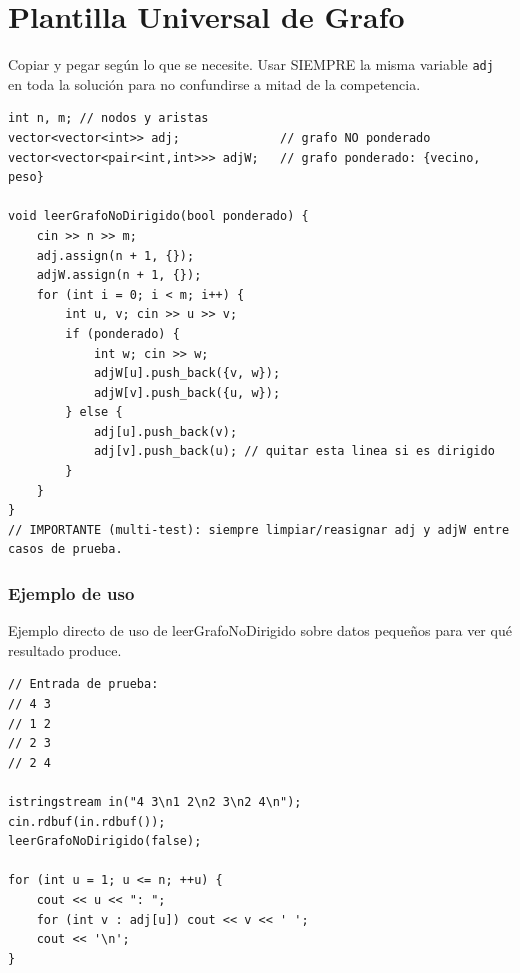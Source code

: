 \documentclass[10pt,twocolumn,letterpaper]{report}
\begin{document}
\section{Plantilla Universal de Grafo}
Copiar y pegar según lo que se necesite. Usar SIEMPRE la misma variable \texttt{adj} en toda la solución para no confundirse a mitad de la competencia.
\begin{lstlisting}
int n, m; // nodos y aristas
vector<vector<int>> adj;              // grafo NO ponderado
vector<vector<pair<int,int>>> adjW;   // grafo ponderado: {vecino, peso}

void leerGrafoNoDirigido(bool ponderado) {
    cin >> n >> m;
    adj.assign(n + 1, {});
    adjW.assign(n + 1, {});
    for (int i = 0; i < m; i++) {
        int u, v; cin >> u >> v;
        if (ponderado) {
            int w; cin >> w;
            adjW[u].push_back({v, w});
            adjW[v].push_back({u, w});
        } else {
            adj[u].push_back(v);
            adj[v].push_back(u); // quitar esta linea si es dirigido
        }
    }
}
// IMPORTANTE (multi-test): siempre limpiar/reasignar adj y adjW entre casos de prueba.
\end{lstlisting}
\subsubsection*{Ejemplo de uso}
Ejemplo directo de uso de leerGrafoNoDirigido sobre datos pequeños para ver qué resultado produce.
\begin{lstlisting}
// Entrada de prueba:
// 4 3
// 1 2
// 2 3
// 2 4

istringstream in("4 3\n1 2\n2 3\n2 4\n");
cin.rdbuf(in.rdbuf());
leerGrafoNoDirigido(false);

for (int u = 1; u <= n; ++u) {
    cout << u << ": ";
    for (int v : adj[u]) cout << v << ' ';
    cout << '\n';
}
\end{lstlisting}


\end{document}
